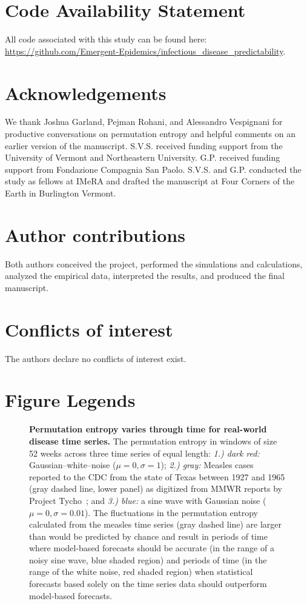 \documentclass[fleqn,12pt]{wlscirep}
\begin{document}
\section*{Code Availability Statement}
All code associated with this study can be found here: \url{https://github.com/Emergent-Epidemics/infectious_disease_predictability}.

\section*{Acknowledgements}
We thank Joshua Garland, Pejman Rohani, and Alessandro Vespignani for productive conversations on permutation entropy and helpful comments on an earlier version of the manuscript. S.V.S. received funding support from the University of Vermont and Northeastern University. G.P. received funding support from Fondazione Compagnia San Paolo. S.V.S. and G.P. conducted the study as fellows at IMeRA and drafted the manuscript at Four Corners of the Earth in Burlington Vermont.

\section*{Author contributions}
Both authors conceived the project, performed the simulations and calculations, analyzed the empirical data, interpreted the results, and produced the final manuscript.

\section*{Conflicts of interest}
The authors declare no conflicts of interest exist.

\newpage

\section*{Figure Legends}
\begin{figure}[H]
	\centering
	\caption{\label{fig:timeserie}\textbf{Permutation entropy varies through time for real-world disease time series.} The permutation entropy in windows of size 52 weeks across three time series of equal length: \textit{1.) dark red:} Gaussian--white--noise ($\mu = 0, \sigma = 1$); \textit{2.) gray:} Measles cases reported to the CDC from the state of Texas between 1927 and 1965 (gray dashed line, lower panel) as digitized from MMWR reports by Project Tycho~\cite{tycho}; and \textit{3.) blue:} a sine wave with Gaussian noise ($\mu = 0, \sigma = 0.01$).  The fluctuations in the permutation entropy calculated from the measles time series (gray dashed line) are larger than would be predicted by chance and result in periods of time where model-based forecasts should be accurate (in the range of a noisy sine wave, blue shaded region) and periods of time (in the range of the white noise, red shaded region) when statistical forecasts based solely on the time series data should outperform model-based forecasts.}
\end{figure}
\end{document}
